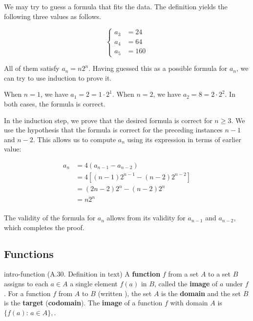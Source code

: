 \documentclass[../src/handouts/main.tex]{subfiles}
\begin{document}
We may try to guess a formula that fits the data.
The definition yields the following three values as follows.

$$
  \begin{cases}
    a_3 & = 24  \\
    a_4 & = 64  \\
    a_5 & = 160
  \end{cases}
$$

All of them satisfy $a_n = n 2^n$.
Having guessed this as a possible formula for $a_n$, we can try to use induction to prove it.

When $n = 1$, we have $a_1 = 2 = 1 \cdot 2^1$.
When $n = 2$, we have $a_2 = 8 = 2 \cdot 2^2$.
In both cases, the formula is correct.

In the induction step, we prove that the desired formula is correct for $n \geq 3$.
We use the hypothesis that the formula is correct for the preceding instances $n - 1$ and $n - 2$.
This allows us to compute $a_n$ using its expression in terms of earlier value:

$$
  \begin{aligned}
    a_n & = 4 (a_{n - 1} - a_{n - 2})                             \\
        & = 4 \left[ (n - 1) 2^{n - 1} - (n - 2) 2^{n -2} \right] \\
        & = (2 n - 2) 2^n - (n - 2) 2^n                           \\
        & = n 2^n                                                 \\
  \end{aligned}
$$

The validity of the formula for $a_n$ allows from its validity for $a_{n -1}$ and $a_{n - 2}$, which completes the proof.

\subsection{Functions}\label{subsec:intro-function}

\begin{definition}{}{intro-function}
  (A.30. Definition in text)
  A \textbf{function} $f$ from a set $A$ to a set $B$ assigns to each $a \in A$ a single element $f(a)$ in $B$, called the \textbf{image} of $a$ under $f$.
  For a function $f$ from $A$ to $B$ (written ), the set $A$ is the \textbf{domain} and the set $B$ is the \textbf{target} (\textbf{codomain}). The \textbf{image} of a function $f$ with domain $A$ is $\{ f(a):\, a \in A \},$.
\end{definition}
\end{document}
